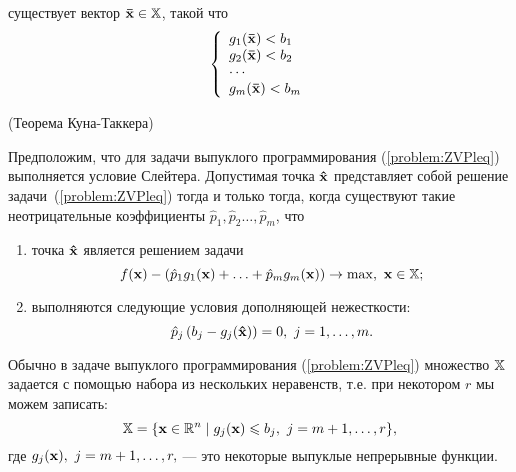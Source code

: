     существует вектор $\mathbf{\bar{x}}\in\mathbb{X}$, такой что
\begin{equation}
\label{Slater1}
    \left\{ \begin{array}{l}
        g_1(\mathbf{\bar x}) < b_1\\
        g_2(\mathbf{\bar x}) < b_2 \\
        \cdots  \\
        g_m(\mathbf{\bar x}) < b_m \\
    \end{array} \right.
\end{equation}


\begin{teop}\label{Kuhn-T-Vip2}(Теорема Куна-Таккера)

    Предположим, что для задачи выпуклого программирования
    (\ref{problem:ZVPleq}) выполняется условие Слейтера.
    Допустимая точка $\mathbf{\hat x}$ представляет собой решение
    задачи~(\ref{problem:ZVPleq}) тогда и только тогда, когда существуют такие
    неотрицательные коэффициенты $\hat p_1, \hat p_2 \ldots, \hat
    p_m$, что



\begin{enumerate}
\renewcommand{\theenumi}{(\arabic{enumi})}
\item точка $\mathbf{\hat x}$ является решением задачи
\begin{equation}\label{KT-Max1}
   f(\mathbf{x}) - (\hat p_1 g_1(\mathbf{x})+ \ldots + \hat p_m g_m(\mathbf{x}))
    \rightarrow\max, \ \mathbf{x}\in\mathbb{X};
 \end{equation}
\item выполняются следующие условия дополняющей нежесткости:
\begin{equation}\label{dop-nezj-vp1}
    \hat p_j \,(b_j-g_j(\vc{\hat x}))=0, \ j=1,\ldots,m.
\end{equation}

\end{enumerate}
\end{teop}

    Обычно в задаче выпуклого программирования
    (\ref{problem:ZVPleq}) множество $\mathbb{X}$ задается с помощью
    набора из нескольких неравенств, т.е. при некотором $r$ мы можем записать:
\[
    \mathbb{X}=\{\mathbf{x}\in\mathbb{R}^{n} \mid g_j (\mathbf{x}) \leqslant b_j,
    \ j = m+1,\ldots,r\},
\]
    где $g_j (\mathbf{x}), \ j = m+1,\ldots,r,$ ---
    это некоторые выпуклые непрерывные функции.

